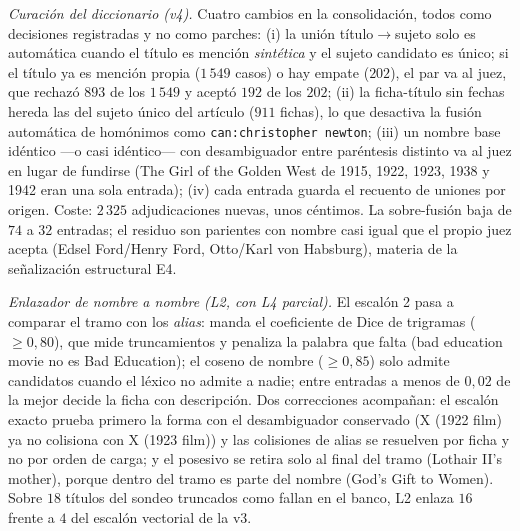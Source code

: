 \documentclass[11pt,a4paper]{article}
\begin{document}
\emph{Curación del diccionario (v4).} Cuatro cambios en la consolidación,
todos como decisiones registradas y no como parches: (i) la unión
título$\to$sujeto solo es automática cuando el título es mención
\emph{sintética} y el sujeto candidato es único; si el título ya es mención
propia ($1\,549$ casos) o hay empate ($202$), el par va al juez, que rechazó
$893$ de los $1\,549$ y aceptó $192$ de los $202$; (ii) la ficha-título sin
fechas hereda las del sujeto único del artículo ($911$ fichas), lo que
desactiva la fusión automática de homónimos como \texttt{can:christopher
newton}; (iii) un nombre base idéntico ---o casi idéntico--- con
desambiguador entre paréntesis distinto va al juez en lugar de fundirse
(\guillemotleft{}The Girl of the Golden West\guillemotright{} de 1915, 1922, 1923, 1938 y 1942 eran
una sola entrada); (iv) cada entrada guarda el recuento de uniones por
origen. Coste: $2\,325$ adjudicaciones nuevas, unos céntimos. La sobre-fusión
baja de $74$ a $32$ entradas; el residuo son parientes con nombre casi
igual que el propio juez acepta (\guillemotleft{}Edsel Ford\guillemotright{}/\guillemotleft{}Henry Ford\guillemotright{},
\guillemotleft{}Otto\guillemotright{}/\guillemotleft{}Karl von Habsburg\guillemotright{}), materia de la señalización
estructural E4.

\emph{Enlazador de nombre a nombre (L2, con L4 parcial).} El escalón 2 pasa a
comparar el tramo con los \emph{alias}: manda el coeficiente de Dice de
trigramas ($\ge 0{,}80$), que mide truncamientos y penaliza la palabra que
falta (\guillemotleft{}bad education movie\guillemotright{} no es \guillemotleft{}Bad Education\guillemotright{}); el coseno de
nombre ($\ge 0{,}85$) solo admite candidatos cuando el léxico no admite a
nadie; entre entradas a menos de $0{,}02$ de la mejor decide la ficha con
descripción. Dos correcciones acompañan: el escalón exacto prueba primero la
forma con el desambiguador conservado (\guillemotleft{}X (1922 film)\guillemotright{} ya no colisiona
con \guillemotleft{}X (1923 film)\guillemotright{}) y las colisiones de alias se resuelven por ficha y
no por orden de carga; y el posesivo se retira solo al final del tramo
(\guillemotleft{}Lothair II's mother\guillemotright{}), porque dentro del tramo es parte del nombre
(\guillemotleft{}God's Gift to Women\guillemotright{}). Sobre $18$ títulos del sondeo truncados como
fallan en el banco, L2 enlaza $16$ frente a $4$ del escalón vectorial de la
v3.
\end{document}
